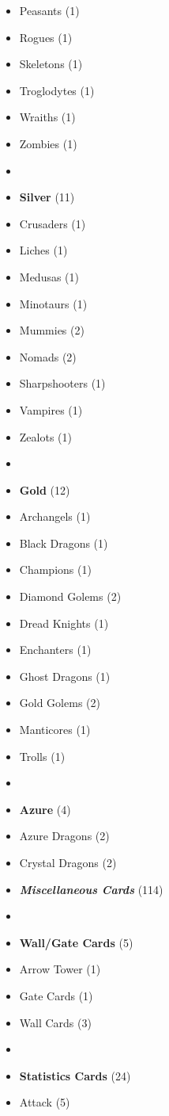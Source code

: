 \begin{multicols*}{3}
\begin{itemize}[leftmargin=0pt, label={}, noitemsep]
  \item Peasants (1)
  \item Rogues (1)
  \item Skeletons (1)
  \item Troglodytes (1)
  \item Wraiths (1)
  \item Zombies (1)
  \item
  \item \textbf{Silver} (11)
  \item Crusaders (1)
  \item Liches (1)
  \item Medusas (1)
  \item Minotaurs (1)
  \item Mummies (2)
  \item Nomads (2)
  \item Sharpshooters (1)
  \item Vampires (1)
  \item Zealots (1)
  \item
  \item \textbf{Gold} (12)
  \item Archangels (1)
  \item Black Dragons (1)
  \item Champions (1)
  \item Diamond Golems (2)
  \item Dread Knights (1)
  \item Enchanters (1)
  \item Ghost Dragons (1)
  \item Gold Golems (2)
  \item Manticores (1)
  \item Trolls (1)
  \item
  \item \textbf{Azure} (4)
  \item Azure Dragons (2)
  \item Crystal Dragons (2)
\columnbreak
  \item \textbf{\emph{Miscellaneous Cards}} (114)
  \item
  \item \textbf{Wall/Gate Cards} (5)
  \item Arrow Tower (1)
  \item Gate Cards (1)
  \item Wall Cards (3)
  \item
  \item \textbf{Statistics Cards} (24)
  \item Attack (5)

\end{itemize}
\end{multicols*}
